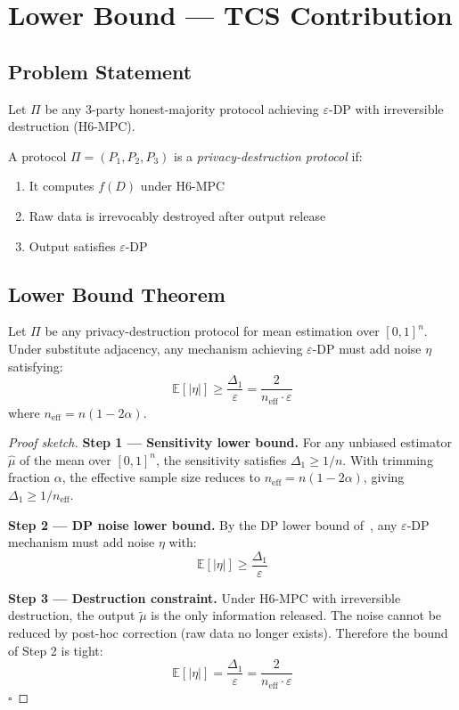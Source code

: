 \section{Lower Bound — TCS Contribution}

\subsection{Problem Statement}

Let $\Pi$ be any 3-party honest-majority
protocol achieving $\varepsilon$-DP with
irreversible destruction (H6-MPC).

\begin{definition}
A protocol $\Pi = (P_1, P_2, P_3)$ is a
\emph{privacy-destruction protocol} if:
\begin{enumerate}
\item It computes $f(D)$ under H6-MPC
\item Raw data is irrevocably destroyed
      after output release
\item Output satisfies $\varepsilon$-DP
\end{enumerate}
\end{definition}

\subsection{Lower Bound Theorem}

\begin{theorem}
\label{thm:lower}
Let $\Pi$ be any privacy-destruction protocol
for mean estimation over $[0,1]^n$.
Under substitute adjacency, any mechanism
achieving $\varepsilon$-DP must add noise
$\eta$ satisfying:
\[
\mathbb{E}[|\eta|] \geq
\frac{\Delta_1}{\varepsilon} =
\frac{2}{n_{\mathrm{eff}} \cdot \varepsilon}
\]
where $n_{\mathrm{eff}} = n(1-2\alpha)$.
\end{theorem}

\begin{proof}[Proof sketch]
\textbf{Step 1 — Sensitivity lower bound.}
For any unbiased estimator $\hat{\mu}$ of
the mean over $[0,1]^n$, the sensitivity
satisfies $\Delta_1 \geq 1/n$.
With trimming fraction $\alpha$, the
effective sample size reduces to
$n_{\mathrm{eff}} = n(1-2\alpha)$,
giving $\Delta_1 \geq 1/n_{\mathrm{eff}}$.

\textbf{Step 2 — DP noise lower bound.}
By the DP lower bound of~\cite{DworkRoth2014},
any $\varepsilon$-DP mechanism must add
noise $\eta$ with:
\[
\mathbb{E}[|\eta|] \geq
\frac{\Delta_1}{\varepsilon}
\]

\textbf{Step 3 — Destruction constraint.}
Under H6-MPC with irreversible destruction,
the output $\tilde{\mu}$ is the only
information released. The noise cannot
be reduced by post-hoc correction
(raw data no longer exists).
Therefore the bound of Step 2 is tight:
\[
\mathbb{E}[|\eta|] =
\frac{\Delta_1}{\varepsilon} =
\frac{2}{n_{\mathrm{eff}} \cdot \varepsilon}
\]
$\square$
\end{proof}


